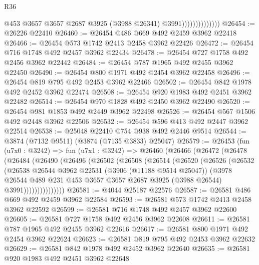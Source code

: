 \begin{lexlean}{R36}
\begin{coremodule}
                                @453
                                @3657
                                @3657
                                @2687
                                @3925
                                (@3988 @26341)
                                @3991))))))))))))))
@26454 := @26226 @22410
@26460 := @26454 @486 @669 @492 @2459 @3962 @22418
@26466 := @26454 @573 @1742 @2413 @2458 @3962 @22426
@26472 := @26454 @716 @1748 @492 @2457 @3962 @22434
@26478 := @26454 @727 @1758 @492 @2456 @3962 @22442
@26484 := @26454 @787 @1965 @492 @2455 @3962 @22450
@26490 := @26454 @800 @1971 @492 @2454 @3962 @22458
@26496 := @26454 @819 @795 @492 @2453 @3962 @22466
@26502 := @26454 @842 @1978 @492 @2452 @3962 @22474
@26508 := @26454 @920 @1983 @492 @2451 @3962 @22482
@26514 := @26454 @970 @1828 @492 @2450 @3962 @22490
@26520 := @26454 @981 @1853 @492 @2449 @3962 @22498
@26526 := @26454 @567 @1506 @492 @2448 @3962 @22506
@26532 := @26454 @596 @413 @492 @2447 @3962 @22514
@26538 := @25048 @22410 @754 @938 @492 @2446 @9514
@26544 := @3874 (@7132 @9511) (@3874 (@7135 @3833) @25047)
@26579 := @26453
    (fun (u7x0 : @3242) =>
    fun (u7x1 : @3242) =>
    @26460
      (@26466
        (@26472
          (@26478
            (@26484
              (@26490
                (@26496
                  (@26502
                    (@26508
                      (@26514
                        (@26520
                          (@26526
                            (@26532
                              (@26538
                                @26544
                                @3962
                                @22531
                                (@3906 (@11188 @9514 @25047))
                                (@3978
                                  @26544
                                  @489
                                  @231
                                  @453
                                  @3657
                                  @3657
                                  @2687
                                  @3925
                                  (@3988 @26544)
                                  @3991)))))))))))))))
@26581 := @4044 @25187 @22576
@26587 := @26581 @486 @669 @492 @2459 @3962 @22584
@26593 := @26581 @573 @1742 @2413 @2458 @3962 @22592
@26599 := @26581 @716 @1748 @492 @2457 @3962 @22600
@26605 := @26581 @727 @1758 @492 @2456 @3962 @22608
@26611 := @26581 @787 @1965 @492 @2455 @3962 @22616
@26617 := @26581 @800 @1971 @492 @2454 @3962 @22624
@26623 := @26581 @819 @795 @492 @2453 @3962 @22632
@26629 := @26581 @842 @1978 @492 @2452 @3962 @22640
@26635 := @26581 @920 @1983 @492 @2451 @3962 @22648

\end{coremodule}
\end{lexlean}
